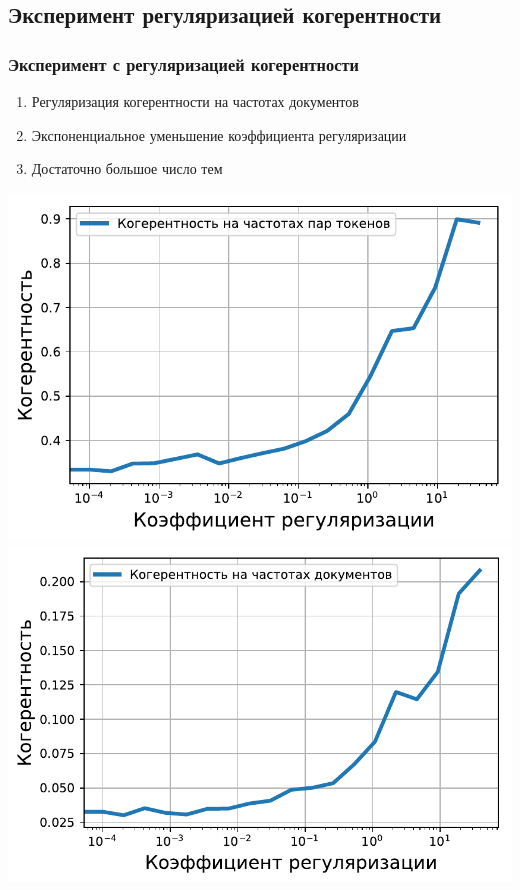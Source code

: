 \documentclass[unicode]{beamer}
\begin{document}
\subsection{Эксперимент регуляризацией когерентности}
\begin{frame}
\frametitle{Эксперимент с регуляризацией когерентности}
\begin{enumerate}
    \item Регуляризация когерентности на частотах документов
    \item Экспоненциальное уменьшение коэффициента регуляризации
    \item Достаточно большое число тем
\end{enumerate}
\begin{center}
    \includegraphics[scale=0.30]{coherence_df_reg_on_ppmi_mmro_tf_score.pdf}
    \includegraphics[scale=0.30]{coherence_df_reg_on_ppmi_mmro_df_score.pdf}

\end{center}
\end{frame}
\end{document}
